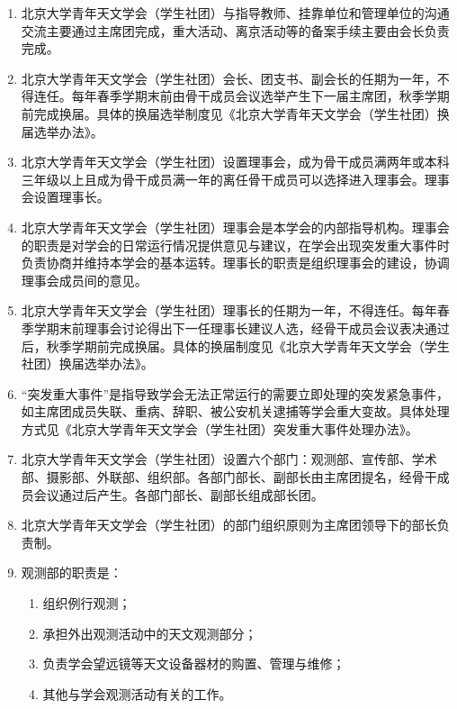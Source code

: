 \begin{enumerate}[resume]
    \item 北京大学青年天文学会（学生社团）与指导教师、挂靠单位和管理单位的沟通交流主要通过主席团完成，重大活动、离京活动等的备案手续主要由会长负责完成。
    
    \item 北京大学青年天文学会（学生社团）会长、团支书、副会长的任期为一年，不得连任。每年春季学期末前由骨干成员会议选举产生下一届主席团，秋季学期前完成换届。具体的换届选举制度见《北京大学青年天文学会（学生社团）换届选举办法》。
    
    \item 北京大学青年天文学会（学生社团）设置理事会，成为骨干成员满两年或本科三年级以上且成为骨干成员满一年的离任骨干成员可以选择进入理事会。理事会设置理事长。
    
    \item 北京大学青年天文学会（学生社团）理事会是本学会的内部指导机构。理事会的职责是对学会的日常运行情况提供意见与建议，在学会出现突发重大事件时负责协商并维持本学会的基本运转。理事长的职责是组织理事会的建设，协调理事会成员间的意见。
    
    \item 北京大学青年天文学会（学生社团）理事长的任期为一年，不得连任。每年春季学期末前理事会讨论得出下一任理事长建议人选，经骨干成员会议表决通过后，秋季学期前完成换届。具体的换届制度见《北京大学青年天文学会（学生社团）换届选举办法》。
    
    \item “突发重大事件”是指导致学会无法正常运行的需要立即处理的突发紧急事件，如主席团成员失联、重病、辞职、被公安机关逮捕等学会重大变故。具体处理方式见《北京大学青年天文学会（学生社团）突发重大事件处理办法》。
    
    \item 北京大学青年天文学会（学生社团）设置六个部门：观测部、宣传部、学术部、摄影部、外联部、组织部。各部门部长、副部长由主席团提名，经骨干成员会议通过后产生。各部门部长、副部长组成部长团。
    
    \item 北京大学青年天文学会（学生社团）的部门组织原则为主席团领导下的部长负责制。
    
    \item 观测部的职责是：
    
    \begin{enumerate}
        \item 组织例行观测；
        \item 承担外出观测活动中的天文观测部分；
        \item 负责学会望远镜等天文设备器材的购置、管理与维修；
        \item 其他与学会观测活动有关的工作。
    \end{enumerate}
    

\end{enumerate}

